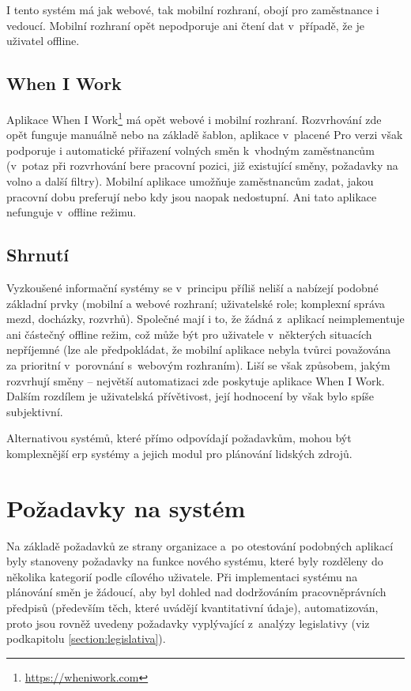 \documentclass[twoside]{ctuthesis}
\begin{document}
I tento systém má jak webové, tak mobilní rozhraní, obojí pro zaměstnance i vedoucí. Mobilní rozhraní opět nepodporuje ani čtení dat v~případě, že je uživatel offline.

\subsection{When I Work}
Aplikace When I Work\footnote{\url{https://wheniwork.com}} má opět webové i mobilní rozhraní. Rozvrhování zde opět funguje manuálně nebo na základě šablon, aplikace v~placené Pro verzi \cite{wheinwork2020pricing} však podporuje i automatické přiřazení volných směn k~vhodným zaměstnancům (v~potaz při rozvrhování bere pracovní pozici, již existující směny, požadavky na volno a další filtry). \cite{wheinwork2020employee} Mobilní aplikace umožňuje zaměstnancům zadat, jakou pracovní dobu preferují nebo kdy jsou naopak nedostupní. Ani tato aplikace nefunguje v~offline režimu.

\subsection{Shrnutí}
Vyzkoušené informační systémy se v~principu příliš neliší a nabízejí podobné základní prvky (mobilní a webové rozhraní; uživatelské role; komplexní správa mezd, docházky, rozvrhů). Společné mají i to, že žádná z~aplikací neimplementuje ani částečný offline režim, což může být pro uživatele v~některých situacích nepříjemné (lze ale předpokládat, že mobilní aplikace nebyla tvůrci považována za prioritní v~porovnání s~webovým rozhraním). Liší se však způsobem, jakým rozvrhují směny -- největší automatizaci zde poskytuje aplikace When I Work. Dalším rozdílem je uživatelská přívětivost, její hodnocení by však bylo spíše subjektivní.

Alternativou systémů, které přímo odpovídají požadavkům, mohou být komplexnější \acrshort{erp} systémy a jejich modul pro plánování lidských zdrojů.

\section{Požadavky na systém}
Na základě požadavků ze strany organizace a~po otestování podobných aplikací byly stanoveny požadavky na funkce nového systému, které byly rozděleny do několika kategorií podle cílového uživatele. Při implementaci systému na plánování směn je žádoucí, aby byl dohled nad dodržováním pracovněprávních předpisů (především těch, které uvádějí kvantitativní údaje), automatizován, proto jsou rovněž uvedeny požadavky vyplývající z~analýzy legislativy (viz podkapitolu \ref{section:legislativa}).
\end{document}

